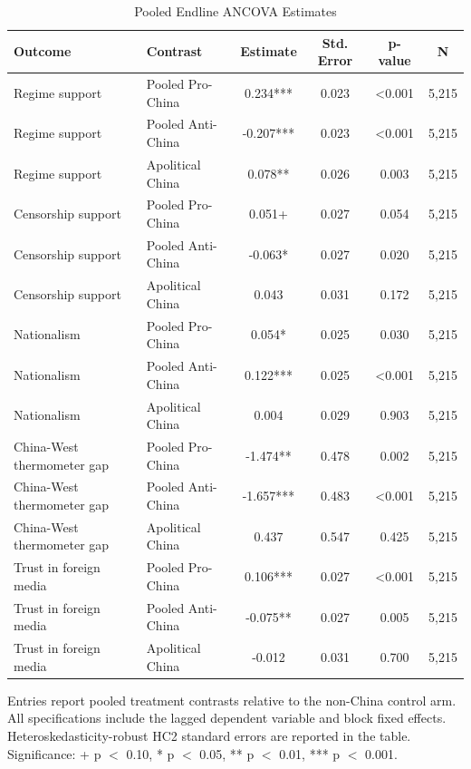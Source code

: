 \begin{table}[H]
\centering
\caption{Pooled Endline ANCOVA Estimates}
\label{tab:pooled_effects_t1}
\footnotesize
\begin{threeparttable}
\begin{tabular}{llcccc}
\toprule
Outcome & Contrast & Estimate & Std. Error & p-value & N \\
\midrule
Regime support & Pooled Pro-China & 0.234*** & 0.023 & <0.001 & 5,215 \\
Regime support & Pooled Anti-China & -0.207*** & 0.023 & <0.001 & 5,215 \\
Regime support & Apolitical China & 0.078** & 0.026 & 0.003 & 5,215 \\
Censorship support & Pooled Pro-China & 0.051+ & 0.027 & 0.054 & 5,215 \\
Censorship support & Pooled Anti-China & -0.063* & 0.027 & 0.020 & 5,215 \\
Censorship support & Apolitical China & 0.043 & 0.031 & 0.172 & 5,215 \\
Nationalism & Pooled Pro-China & 0.054* & 0.025 & 0.030 & 5,215 \\
Nationalism & Pooled Anti-China & 0.122*** & 0.025 & <0.001 & 5,215 \\
Nationalism & Apolitical China & 0.004 & 0.029 & 0.903 & 5,215 \\
China-West thermometer gap & Pooled Pro-China & -1.474** & 0.478 & 0.002 & 5,215 \\
China-West thermometer gap & Pooled Anti-China & -1.657*** & 0.483 & <0.001 & 5,215 \\
China-West thermometer gap & Apolitical China & 0.437 & 0.547 & 0.425 & 5,215 \\
Trust in foreign media & Pooled Pro-China & 0.106*** & 0.027 & <0.001 & 5,215 \\
Trust in foreign media & Pooled Anti-China & -0.075** & 0.027 & 0.005 & 5,215 \\
Trust in foreign media & Apolitical China & -0.012 & 0.031 & 0.700 & 5,215 \\
\bottomrule
\end{tabular}
\begin{tablenotes}[flushleft]
\footnotesize
\item Entries report pooled treatment contrasts relative to the non-China control arm. All specifications include the lagged dependent variable and block fixed effects. Heteroskedasticity-robust HC2 standard errors are reported in the table. Significance: + p $<$ 0.10, * p $<$ 0.05, ** p $<$ 0.01, *** p $<$ 0.001.
\end{tablenotes}
\end{threeparttable}
\end{table}
